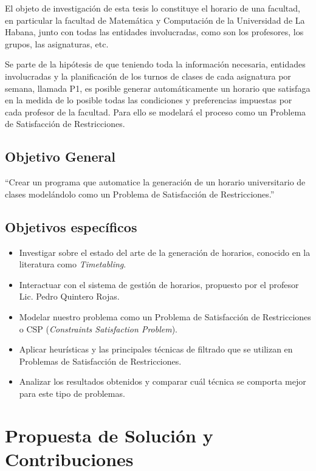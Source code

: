 \begin{introduction}
El objeto de investigación de esta tesis lo constituye el horario de una facultad, en particular la facultad de Matem\'atica y Computaci\'on de la Universidad de La Habana, junto con todas las entidades involucradas, como son los profesores, los grupos, las asignaturas, etc.

Se parte de la hipótesis de que teniendo toda la información necesaria, entidades involucradas y la
planificación de los turnos de clases de cada asignatura por semana, llamada P1, es posible generar
automáticamente un horario que satisfaga en la medida de lo posible todas las condiciones y preferencias
impuestas por cada profesor de la facultad. Para ello se modelar\'a el proceso como un Problema de Satisfacci\'on de Restricciones.


\subsection*{Objetivo General}

``Crear un programa que automatice la generación de un horario universitario de clases model\'andolo como un Problema de Satisfacci\'on de Restricciones.''

\subsection*{Objetivos específicos}

\begin{itemize}
	\item Investigar sobre el estado del arte de la generación de horarios, conocido en la literatura
		como \emph{Timetabling}.
	\item Interactuar con el sistema de gestión de horarios, propuesto por el profesor Lic. Pedro
		Quintero Rojas.
	\item Modelar nuestro problema como un Problema de Satisfacción de Restricciones o CSP (\emph{Constraints 
		Satisfaction Problem}).
	\item Aplicar heurísticas y las principales técnicas de filtrado que se utilizan en Problemas de
		Satisfacción de Restricciones.
	\item Analizar los resultados obtenidos y comparar cu\'al técnica se comporta mejor para este tipo de
		problemas.
\end{itemize}

\section*{Propuesta de Solución y Contribuciones}


\end{introduction}
